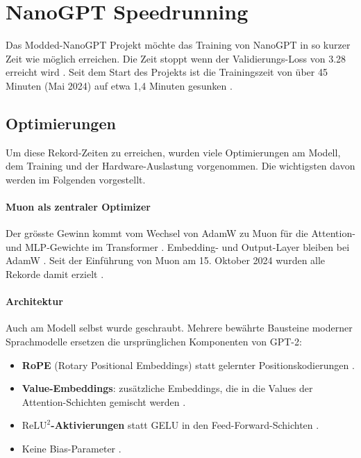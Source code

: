 \section{NanoGPT Speedrunning}

Das Modded-NanoGPT Projekt möchte das Training von NanoGPT in so kurzer Zeit wie möglich erreichen. Die Zeit stoppt wenn der Validierungs-Loss von 3.28 erreicht wird \cite{keller_modded_nanogpt_2024}.
Seit dem Start des Projekts ist die Trainingszeit von über 45 Minuten (Mai 2024) auf etwa 1,4 Minuten gesunken \cite{keller_modded_nanogpt_2024}.

\subsection*{Optimierungen}

Um diese Rekord-Zeiten zu erreichen, wurden viele Optimierungen am Modell, dem Training und der Hardware-Auslastung vorgenommen. Die wichtigsten davon werden im Folgenden vorgestellt.

\paragraph{Muon als zentraler Optimizer}
Der grösste Gewinn kommt vom Wechsel von AdamW zu Muon für die Attention- und MLP-Gewichte im Transformer \cite{keller_modded_nanogpt_2024}.
Embedding- und Output-Layer bleiben bei AdamW \cite{keller_muon_2024}.
Seit der Einführung von Muon am 15. Oktober 2024 wurden alle Rekorde damit erzielt \cite{keller_muon_2024}.

\paragraph{Architektur}
Auch am Modell selbst wurde geschraubt. Mehrere bewährte Bausteine moderner Sprachmodelle ersetzen die ursprünglichen Komponenten von GPT-2:
\begin{itemize}
    \item \textbf{RoPE} (Rotary Positional Embeddings) statt gelernter Positionskodierungen \cite{keller_modded_nanogpt_2024}.
    \item \textbf{Value-Embeddings}: zusätzliche Embeddings, die in die Values der Attention-Schichten gemischt werden \cite{keller_modded_nanogpt_2024}.
    \item \textbf{$\mathrm{ReLU}^2$-Aktivierungen} statt GELU in den Feed-Forward-Schichten \cite{keller_modded_nanogpt_2024}.
    \item Keine Bias-Parameter \cite{keller_modded_nanogpt_2024}.
\end{itemize}

